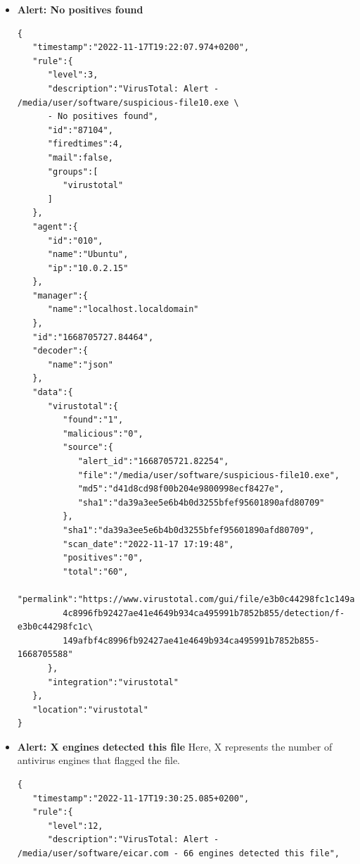 \begin{enumerate}
\begin{itemize}
\begin{verbatim}
      "description":"VirusTotal: Error: Public API request rate limit reached",
      "id":"87101",
      "firedtimes":2,
      "mail":false,
      "groups":[
         "virustotal"
      ]
   },
   "agent":{
      "id":"000",
      "name":"localhost.localdomain"
   },
   "manager":{
      "name":"localhost.localdomain"
   },
   "id":"1668705733.90632",
   "decoder":{
      "name":"json"
   },
   "data":{
      "virustotal":{
         "error":"204",
         "description":"Error: Public API request rate limit reached"
      },
      "integration":"virustotal"
   },
   "location":"virustotal"
}
\end{verbatim}
        \item \textbf{Alert: No positives found}
\begin{verbatim}
{
   "timestamp":"2022-11-17T19:22:07.974+0200",
   "rule":{
      "level":3,
      "description":"VirusTotal: Alert - /media/user/software/suspicious-file10.exe \
      - No positives found",
      "id":"87104",
      "firedtimes":4,
      "mail":false,
      "groups":[
         "virustotal"
      ]
   },
   "agent":{
      "id":"010",
      "name":"Ubuntu",
      "ip":"10.0.2.15"
   },
   "manager":{
      "name":"localhost.localdomain"
   },
   "id":"1668705727.84464",
   "decoder":{
      "name":"json"
   },
   "data":{
      "virustotal":{
         "found":"1",
         "malicious":"0",
         "source":{
            "alert_id":"1668705721.82254",
            "file":"/media/user/software/suspicious-file10.exe",
            "md5":"d41d8cd98f00b204e9800998ecf8427e",
            "sha1":"da39a3ee5e6b4b0d3255bfef95601890afd80709"
         },
         "sha1":"da39a3ee5e6b4b0d3255bfef95601890afd80709",
         "scan_date":"2022-11-17 17:19:48",
         "positives":"0",
         "total":"60",
         "permalink":"https://www.virustotal.com/gui/file/e3b0c44298fc1c149afbf\
         4c8996fb92427ae41e4649b934ca495991b7852b855/detection/f-e3b0c44298fc1c\
         149afbf4c8996fb92427ae41e4649b934ca495991b7852b855-1668705588"
      },
      "integration":"virustotal"
   },
   "location":"virustotal"
}
\end{verbatim}
        \item \textbf{Alert: X engines detected this file}
        Here, X represents the number of antivirus engines that flagged the file.
    \begin{verbatim}
{
   "timestamp":"2022-11-17T19:30:25.085+0200",
   "rule":{
      "level":12,
      "description":"VirusTotal: Alert - /media/user/software/eicar.com - 66 engines detected this file",

\end{verbatim}
\end{itemize}
\end{enumerate}
